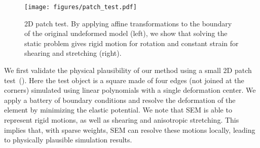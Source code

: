 

\begin{figure}[h]
  \texttt{[image: figures/patch\_test.pdf]}
  \caption{2D patch test. By applying affine transformations to the boundary of the original undeformed model (left), we show that solving the static problem gives rigid motion for rotation and constant strain for shearing and stretching (right).}
  \label{fig:patchtest}
\end{figure}


We first validate the physical plausibility of our method using a small 2D patch test~(). 
Here the test object is a square made of four edges (not joined at the corners) simulated using linear polynomials with a single deformation center.
We apply a battery of boundary conditions and resolve the deformation of the element by minimizing the elastic potential.
We note that SEM is able to represent rigid motions, as well as shearing and anisotropic stretching. 
This implies that, with sparse weights, SEM can resolve these motions locally, leading to physically plausible simulation results.

